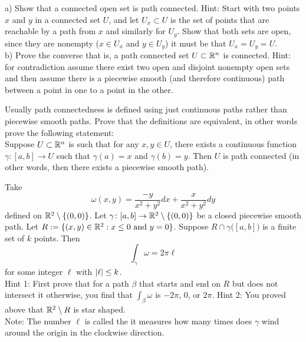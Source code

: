 \begin{exercise}
a)
Show that a connected open set is path connected.  Hint: Start with two
points $x$ and $y$ in a connected set $U$, and let $U_x \subset U$ is the set of points that are
reachable by a path from $x$ and similarly for $U_y$.  Show that both sets
are open, since they are nonempty ($x \in U_x$ and $y \in U_y$) it must be
that $U_x = U_y = U$.
\\
b) Prove the converse that is, a path connected set $U \subset {\mathbb{R}}^n$ is
connected.  Hint: for contradiction assume there exist two open and disjoint nonempty open
sets and then assume there is a piecewise smooth (and therefore continuous)
path between a point in one to a point in the other.
\end{exercise}

\begin{exercise}
Usually path connectedness is defined using just continuous paths rather
than piecewise smooth paths.  Prove that the definitions are equivalent, in
other words prove the following statement:\\
Suppose $U \subset {\mathbb{R}}^n$ is such that for any $x,y \in U$, there exists a continuous function
$\gamma \colon [a,b] \to U$ such that $\gamma(a) = x$ and $\gamma(b) = y$.
Then $U$ is path connected (in other words, then there exists a piecewise
smooth path).
\end{exercise}

\begin{exercise}[Hard]
Take
\begin{equation*}
\omega(x,y) = \frac{-y}{x^2+y^2} dx + \frac{x}{x^2+y^2} dy
\end{equation*}
defined on ${\mathbb{R}}^2 \setminus \{ (0,0) \}$.  Let $\gamma \colon [a,b] \to {\mathbb{R}}^2
\setminus \{ (0,0) \}$ be a closed piecewise smooth path.
Let $R:=\{ (x,y) \in {\mathbb{R}}^2 : x \leq 0 \text{ and } y=0 \}$.
Suppose $R \cap \gamma\bigl([a,b]\bigr)$ is a finite set of $k$ points.  Then
\begin{equation*}
\int_{\gamma} \omega = 2 \pi \ell 
\end{equation*}
for some integer $\ell$ with $\left\lvert {\ell} \right\rvert \leq k$.\\
Hint 1: First prove that for a path $\beta$ that starts and end on $R$ but
does not intersect it otherwise, you find that $\int_{\beta} \omega$
is $-2\pi$, 0, or $2\pi$.
Hint 2: You proved above that ${\mathbb{R}}^2 \setminus R$ is star shaped.
\\
Note: The number $\ell$ is called the \emph{} it measures how many
times does $\gamma$ wind around the origin in the clockwise direction.
\end{exercise}
